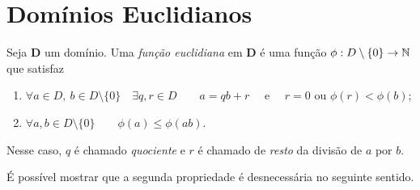 \section{Domínios Euclidianos}

\begin{defi}
	Seja $\bm D$ um domínio. Uma \emph{função euclidiana} em $\bm D$ é uma função $\phi: D \setminus \{0\} \to \mathbb{N}$ que satisfaz
	\begin{enumerate}
	\item $\forall a \in D,\ b \in D \setminus \{0\} \quad \exists q,r \in D \qquad a=qb+r \quad \text{\ \ e\ \ }\quad r=0 \text{\ \ ou\ \ } \phi(r)<\phi(b)$;
	\item $\forall a,b \in D \setminus \{0\} \qquad \phi(a) \leq \phi(ab)$.
	\end{enumerate}
	Nesse caso, $q$ é chamado \emph{quociente} e $r$ é chamado de \emph{resto} da divisão de $a$ por $b$.
\end{defi}

	É possível mostrar que a segunda propriedade é desnecessária no seguinte sentido.

